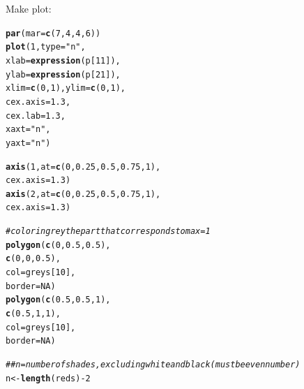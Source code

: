 \documentclass{article}\usepackage[]{graphicx}\usepackage[]{color}
\makeatletter
\newcommand{\hlnum}[1]{\textcolor[rgb]{0.686,0.059,0.569}{#1}}%
\newcommand{\hlstr}[1]{\textcolor[rgb]{0.192,0.494,0.8}{#1}}%
\newcommand{\hlcom}[1]{\textcolor[rgb]{0.678,0.584,0.686}{\textit{#1}}}%
\newcommand{\hlopt}[1]{\textcolor[rgb]{0,0,0}{#1}}%
\newcommand{\hlstd}[1]{\textcolor[rgb]{0.345,0.345,0.345}{#1}}%
\newcommand{\hlkwb}[1]{\textcolor[rgb]{0.69,0.353,0.396}{#1}}%
\newcommand{\hlkwc}[1]{\textcolor[rgb]{0.333,0.667,0.333}{#1}}%
\newcommand{\hlkwd}[1]{\textcolor[rgb]{0.737,0.353,0.396}{\textbf{#1}}}%
\newenvironment{kframe}{%
 \def\at@end@of@kframe{}%
 \ifinner\ifhmode%
  \def\at@end@of@kframe{\end{minipage}}%
  \begin{minipage}{\columnwidth}%
 \fi\fi%
 \def\FrameCommand##1{\hskip\@totalleftmargin \hskip-\fboxsep
 \colorbox{shadecolor}{##1}\hskip-\fboxsep
     \hskip-\linewidth \hskip-\@totalleftmargin \hskip\columnwidth}%
 \MakeFramed {\advance\hsize-\width
   \@totalleftmargin\z@ \linewidth\hsize
   \@setminipage}}%
 {\par\unskip\endMakeFramed%
 \at@end@of@kframe}
\newenvironment{knitrout}{}{} %
\makeatother
\begin{document}
Make plot:
\begin{knitrout}
\color{fgcolor}\begin{kframe}
\begin{alltt}
\hlkwd{par}\hlstd{(}\hlkwc{mar}\hlstd{=}\hlkwd{c}\hlstd{(}\hlnum{7}\hlstd{,}\hlnum{4}\hlstd{,}\hlnum{4}\hlstd{,}\hlnum{6}\hlstd{))}
\hlkwd{plot}\hlstd{(}\hlnum{1}\hlstd{,} \hlkwc{type}\hlstd{=}\hlstr{"n"}\hlstd{,}
     \hlkwc{xlab}\hlstd{=}\hlkwd{expression}\hlstd{(p[}\hlnum{11}\hlstd{]),}
     \hlkwc{ylab}\hlstd{=}\hlkwd{expression}\hlstd{(p[}\hlnum{21}\hlstd{]),}
     \hlkwc{xlim}\hlstd{=}\hlkwd{c}\hlstd{(}\hlnum{0}\hlstd{,} \hlnum{1}\hlstd{),} \hlkwc{ylim}\hlstd{=}\hlkwd{c}\hlstd{(}\hlnum{0}\hlstd{,} \hlnum{1}\hlstd{),}
     \hlkwc{cex.axis}\hlstd{=}\hlnum{1.3}\hlstd{,}
     \hlkwc{cex.lab}\hlstd{=}\hlnum{1.3}\hlstd{,}
     \hlkwc{xaxt}\hlstd{=}\hlstr{"n"}\hlstd{,}
     \hlkwc{yaxt}\hlstd{=}\hlstr{"n"}\hlstd{)}

\hlkwd{axis}\hlstd{(}\hlnum{1}\hlstd{,} \hlkwc{at}\hlstd{=}\hlkwd{c}\hlstd{(}\hlnum{0}\hlstd{,}\hlnum{0.25}\hlstd{,}\hlnum{0.5}\hlstd{,}\hlnum{0.75}\hlstd{,}\hlnum{1}\hlstd{),}
     \hlkwc{cex.axis}\hlstd{=}\hlnum{1.3}\hlstd{)}
\hlkwd{axis}\hlstd{(}\hlnum{2}\hlstd{,} \hlkwc{at}\hlstd{=}\hlkwd{c}\hlstd{(}\hlnum{0}\hlstd{,}\hlnum{0.25}\hlstd{,}\hlnum{0.5}\hlstd{,}\hlnum{0.75}\hlstd{,}\hlnum{1}\hlstd{),}
     \hlkwc{cex.axis}\hlstd{=}\hlnum{1.3}\hlstd{)}

\hlcom{#color in grey the part that corresponds to max = 1}
\hlkwd{polygon}\hlstd{(}\hlkwd{c}\hlstd{(}  \hlnum{0}\hlstd{,}\hlnum{0.5}\hlstd{,}\hlnum{0.5}\hlstd{),}
        \hlkwd{c}\hlstd{(}  \hlnum{0}\hlstd{,}  \hlnum{0}\hlstd{,}\hlnum{0.5}\hlstd{),}
        \hlkwc{col}\hlstd{=greys[}\hlnum{10}\hlstd{],}
        \hlkwc{border}\hlstd{=}\hlnum{NA}\hlstd{)}
\hlkwd{polygon}\hlstd{(}\hlkwd{c}\hlstd{(}\hlnum{0.5}\hlstd{,}\hlnum{0.5}\hlstd{,}  \hlnum{1}\hlstd{),}
        \hlkwd{c}\hlstd{(}\hlnum{0.5}\hlstd{,}  \hlnum{1}\hlstd{,}  \hlnum{1}\hlstd{),}
        \hlkwc{col}\hlstd{=greys[}\hlnum{10}\hlstd{],}
        \hlkwc{border}\hlstd{=}\hlnum{NA}\hlstd{)}

\hlcom{##n = number of shades, excluding white and black (must be even number)}
\hlstd{n} \hlkwb{<-} \hlkwd{length}\hlstd{(reds)}\hlopt{-}\hlnum{2}


\end{alltt}
\end{kframe}
\end{knitrout}
\end{document}
